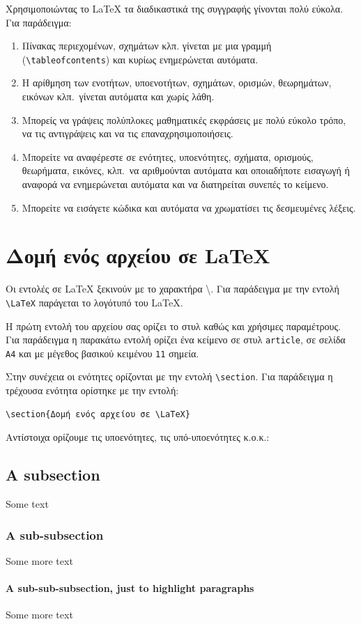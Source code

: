 Χρησιμοποιώντας το {\LaTeX} τα διαδικαστικά της συγγραφής γίνονται πολύ εύκολα. Για παράδειγμα:
\begin{enumerate}
\item
Πίνακας περιεχομένων, σχημάτων κλπ. γίνεται με μια γραμμή (\texttt{{\textbackslash}tableofcontents}) και κυρίως ενημερώνεται αυτόματα.
\item
Η αρίθμηση των ενοτήτων, υποενοτήτων, σχημάτων, ορισμών, θεωρημάτων, εικόνων κλπ.\ γίνεται αυτόματα και χωρίς λάθη.
\item
Μπορείς να γράψεις πολύπλοκες μαθηματικές εκφράσεις με πολύ εύκολο τρόπο, να τις αντιγράψεις και να τις επαναχρησιμοποιήσεις.
\item
Μπορείτε να αναφέρεστε σε ενότητες, υποενότητες, σχήματα, ορισμούς, θεωρήματα, εικόνες, κλπ.\ να αριθμούνται αυτόματα και οποιαδήποτε εισαγωγή ή αναφορά να ενημερώνεται αυτόματα και να διατηρείται συνεπές το κείμενο.  
\item
Μπορείτε να εισάγετε κώδικα και αυτόματα να χρωματίσει τις δεσμευμένες λέξεις. 
\end{enumerate}

%
%
\section{Δομή ενός αρχείου σε \LaTeX}

Οι εντολές σε {\LaTeX} ξεκινούν με το χαρακτήρα \textbackslash. Για παράδειγμα με την εντολή \texttt{{\textbackslash}LaTeX} παράγεται το λογότυπό του \LaTeX.

Η πρώτη εντολή του αρχείου σας ορίζει το στυλ καθώς και χρήσιμες παραμέτρους. Για παράδειγμα η παρακάτω εντολή ορίζει ένα κείμενο σε στυλ \texttt{article}, σε σελίδα \texttt{A4} και με μέγεθος βασικού κειμένου \texttt{11} σημεία.


Στην συνέχεια οι ενότητες ορίζονται με την εντολή \texttt{{\textbackslash}section}. Για παράδειγμα η τρέχουσα ενότητα ορίστηκε με την εντολή: 
\begin{verbatim}
\section{Δομή ενός αρχείου σε \LaTeX}
\end{verbatim}
Αντίστοιχα ορίζουμε τις υποενότητες, τις υπό-υποενότητες κ.ο.κ.:
\begin{latex}
\subsection{A subsection}
Some text
\subsubsection{A sub-subsection}
Some more text
\paragraph{A sub-sub-subsection, just to highlight paragraphs}
Some more text
\end{latex}

